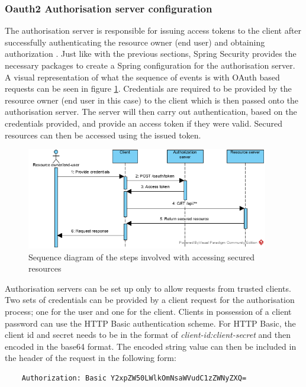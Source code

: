\subsubsection{Oauth2 Authorisation server configuration}
The authorisation server is responsible for issuing access tokens to the client after successfully authenticating the resource owner (end user)
and obtaining authorization \cite{hardt2012oauth}.
Just like with the previous sections, Spring Security provides the necessary packages to create a Spring configuration for the authorisation
server.
A visual representation of what the sequence of events is with OAuth based requests can be seen in figure \ref{oauthgrantflow}.
Credentials are required to be provided by the resource owner (end user in this case) to the client which is then passed onto the authorisation
server.
The server will then carry out authentication, based on the credentials provided, and provide an access token if they were valid.
Secured resources can then be accessed using the issued token.

\clearpage
\begin{figure}[ht]
    \centering
    \includegraphics[width=400px]{images/oauth_grant_flow.png}
    \caption{Sequence diagram of the steps involved with accessing secured resources}
    \label{oauthgrantflow}
\end{figure}

Authorisation servers can be set up only to allow requests from trusted clients.
Two sets of credentials can be provided by a client request for the authorisation process; one for the user and one for the client.
Clients in possession of a client password can use the HTTP Basic authentication scheme.
For HTTP Basic, the client id and secret needs to be in the format of \emph{client-id:client-secret} and then encoded in the
base64 format. The encoded string value can then be included in the header of the request in the following form: 

\begin{verbatim}
    Authorization: Basic Y2xpZW50LWlkOmNsaWVudC1zZWNyZXQ=
\end{verbatim}

